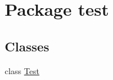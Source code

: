 \hypertarget{namespacetest}{\section{Package test}
\label{namespacetest}
}
\subsection*{Classes}
\begin{DoxyCompactItemize}
\item 
class \hyperlink{classtest_1_1_test}{Test}
\end{DoxyCompactItemize}
